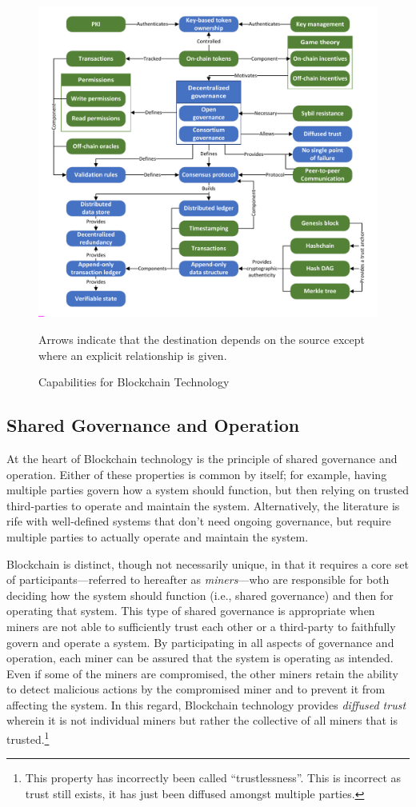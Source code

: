 \begin{figure}
	\centering
	\includegraphics[page=4,width=.75\textwidth]{figures/grounded-theory-main}
	
	Arrows indicate that the destination depends on the source except where an explicit relationship is given.
	\caption{Capabilities for Blockchain Technology}
	\label{fig:Capabilities}
\end{figure}

\subsection{Shared Governance and Operation}
At the heart of Blockchain technology is the principle of shared governance and operation.
Either of these properties is common by itself; for example, having multiple parties govern how a system should function, but then relying on trusted third-parties to operate and maintain the system.
Alternatively, the literature is rife with well-defined systems that don't need ongoing governance, but require multiple parties to actually operate and maintain the system.

Blockchain is distinct, though not necessarily unique, in that it requires a core set of participants---referred to hereafter as \emph{miners}---who are responsible for both deciding how the system should function (i.e., shared governance) and then for operating that system.
This type of shared governance is appropriate when miners are not able to sufficiently trust each other or a third-party to faithfully govern and operate a system.
By participating in all aspects of governance and operation, each miner can be assured that the system is operating as intended.
Even if some of the miners are compromised, the other miners retain the ability to detect malicious actions by the compromised miner and to prevent it from affecting the system.
In this regard, Blockchain technology provides \emph{diffused trust} wherein it is not individual miners but rather the collective of all miners that is trusted.\footnote{This property has incorrectly been called ``trustlessness''. This is incorrect as trust still exists, it has just been diffused amongst multiple parties.} 

